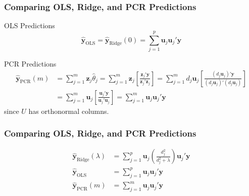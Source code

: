 \begin{frame}
  \frametitle{Comparing OLS, Ridge, and PCR Predictions}

\begin{block}{OLS Predictions}
  \vspace{-1em}
  \[
    \widehat{\mathbf{y}}_{\text{OLS}} = \widehat{\mathbf{y}}_{\text{Ridge}}(0) = \sum_{j=1}^p   \mathbf{u}_j\mathbf{u}_j'\mathbf{y} 
  \]
\end{block}

\begin{block}{PCR Predictions}
  \begin{align*}
    \widehat{\mathbf{y}}_{\text{PCR}}(m) &= \sum_{j = 1}^m \mathbf{z}_j\widehat{\theta}_j = \sum_{j=1}^{m} \mathbf{z}_j \left[\frac{\mathbf{z}_j' \mathbf{y}}{\mathbf{z}_j' \mathbf{z}_j}\right] = \sum_{j=1}^m d_j \mathbf{u}_j \left[ \frac{(d_j \mathbf{u}_j)' \mathbf{y}}{(d_j \mathbf{u}_j)'(d_j \mathbf{u}_j)} \right]\\
    &= \sum_{j=1}^m \mathbf{u}_j \left[ \frac{\mathbf{u}_j' \mathbf{y}}{\mathbf{u}_j'\mathbf{u}_j} \right] = \sum_{j=1}^m \mathbf{u}_j \mathbf{u}_j' \mathbf{y}
      \end{align*}
since $U$ has orthonormal columns.
\end{block}

\end{frame}
\begin{frame}
  \frametitle{Comparing OLS, Ridge, and PCR Predictions}

  \small
  \begin{align*}
    \widehat{\mathbf{y}}_{\text{Ridge}}(\lambda) &= \sum_{j=1}^p   \mathbf{u}_j\left( \frac{d_j^2}{d_j^2 + \lambda} \right)\mathbf{u}_j'\mathbf{y}\\
    \widehat{\mathbf{y}}_{\text{OLS}} &= \sum_{j=1}^p   \mathbf{u}_j\mathbf{u}_j'\mathbf{y}\\ 
    \widehat{\mathbf{y}}_{\text{PCR}}(m) &= \sum_{j=1}^m \mathbf{u}_j \mathbf{u}_j' \mathbf{y}
  \end{align*}

\end{frame}
